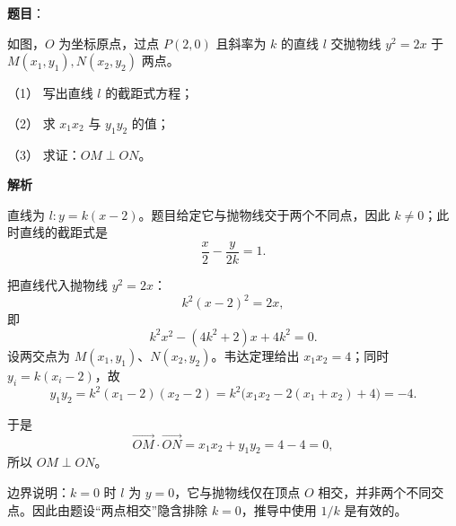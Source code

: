 \begin{answer}

\textbf{题目}：

如图，$O$ 为坐标原点，过点 $P(2,0)$ 且斜率为 $k$ 的直线 $l$ 交抛物线 $y^2=2x$ 于 $M(x_1,y_1),N(x_2,y_2)$ 两点。

（1） 写出直线 $l$ 的截距式方程；

（2） 求 $x_1x_2$ 与 $y_1y_2$ 的值；

（3） 求证：$OM\perp ON$。
\nopagebreak[4]
\begin{center}\end{center}
\nopagebreak[4]

\textbf{解析}


直线为 $l:y=k(x-2)$。题目给定它与抛物线交于两个不同点，因此 $k\ne0$；此时直线的截距式是
\nopagebreak[4]
\[
\frac{x}{2}-\frac{y}{2k}=1.
\]


把直线代入抛物线 $y^2=2x$：
\nopagebreak[4]
\[
k^2(x-2)^2=2x,
\]
即
\nopagebreak[4]
\[
k^2x^2-(4k^2+2)x+4k^2=0.
\]
设两交点为 $M(x_1,y_1)$、$N(x_2,y_2)$。韦达定理给出 $x_1x_2=4$；同时 $y_i=k(x_i-2)$，故
\nopagebreak[4]
\[
y_1y_2=k^2(x_1-2)(x_2-2)
=k^2\bigl(x_1x_2-2(x_1+x_2)+4\bigr)=-4.
\]


于是
\nopagebreak[4]
\[
\overrightarrow{OM}\cdot\overrightarrow{ON}=x_1x_2+y_1y_2=4-4=0,
\]
所以 $OM\perp ON$。

边界说明：$k=0$ 时 $l$ 为 $y=0$，它与抛物线仅在顶点 $O$ 相交，并非两个不同交点。因此由题设“两点相交”隐含排除 $k=0$，推导中使用 $1/k$ 是有效的。




\end{answer}
